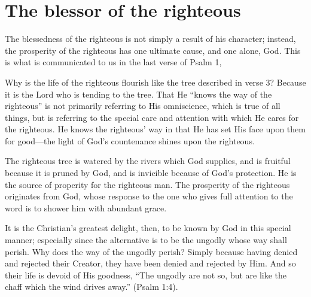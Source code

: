 \section{The blessor of the righteous}
The blessedness of the righteous is not simply a result of his character;
    instead, the prosperity of the righteous has one ultimate cause, and one alone,
    God.
This is what is communicated to us in the last verse of Psalm 1,

Why is the life of the righteous flourish like the tree
    described in verse 3?
Because it is the Lord who is tending to the tree.
That He ``knows the way of the righteous'' is not primarily
    referring to His omniscience, which is true of all things,
    but is referring to the special care and attention 
    with which He cares for the righteous.
He knows the righteous' way in that He has set His face upon them for good---the
    light of God's countenance shines upon the righteous.

The righteous tree is watered by the rivers which God supplies,
    and is fruitful because it is pruned by God,
    and is invicible because of God's protection.
He is the source of properity for the righteous man.  
The prosperity of the righteous originates from God,
    whose response to the one who gives full attention to the word
    is to shower him with abundant grace.

It is the Christian's greatest delight, then,
    to be known by God in this special manner;
    especially since the alternative is to be the ungodly
    whose way shall perish.
Why does the way of the ungodly perish?
Simply because having denied and rejected their Creator,
    they have been denied and rejected by Him.
And so their life is devoid of His goodness,
    ``The ungodly are not so,
    but are like the chaff which the wind drives away.''
    (Psalm 1:4).



